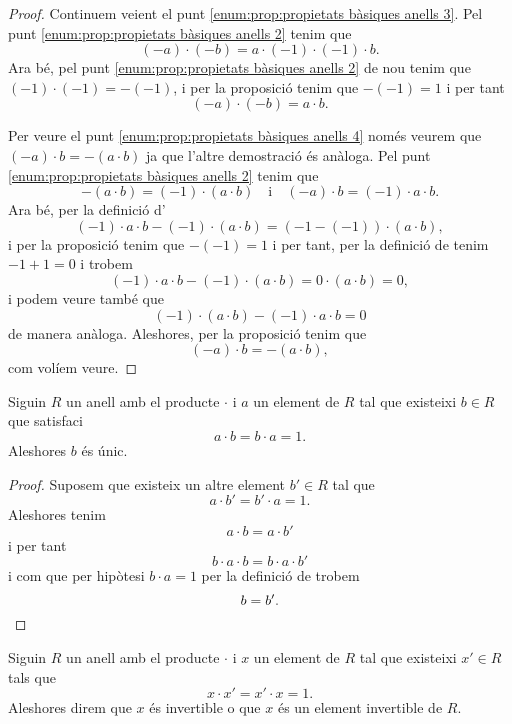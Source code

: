 \documentclass[../Apunts.tex]{subfiles}
\begin{document}
\begin{proposition}
\begin{proof}
			Continuem veient el punt \eqref{enum:prop:propietats bàsiques anells 3}. Pel punt \eqref{enum:prop:propietats bàsiques anells 2} tenim que
			\[(-a)\cdot(-b)=a\cdot (-1)\cdot(-1)\cdot b.\]
			Ara bé, pel punt \eqref{enum:prop:propietats bàsiques anells 2} de nou tenim que \((-1)\cdot(-1)=-(-1)\), i per la proposició  tenim que \(-(-1)=1\) i per tant
			\[(-a)\cdot(-b)=a\cdot b.\]
			
			Per veure el punt \eqref{enum:prop:propietats bàsiques anells 4} només veurem que \((-a)\cdot b=-(a\cdot b)\) ja que l'altre demostració és anàloga. Pel punt \eqref{enum:prop:propietats bàsiques anells 2} tenim que
			\[-(a\cdot b)=(-1)\cdot(a\cdot b)\quad{\text{i}}\quad(-a)\cdot b=(-1)\cdot a\cdot b.\]
			Ara bé, per la definició d'
			\[(-1)\cdot a\cdot b-(-1)\cdot(a\cdot b)=(-1-(-1))\cdot(a\cdot b),\]
			i per la proposició  tenim que \(-(-1)=1\) i per tant, per la definició de  tenim \(-1+1=0\) i trobem
			\[(-1)\cdot a\cdot b-(-1)\cdot(a\cdot b)=0\cdot(a\cdot b)=0,\]
			i podem veure també que
			\[(-1)\cdot(a\cdot b)-(-1)\cdot a\cdot b=0\]
			de manera anàloga. Aleshores, per la proposició  tenim que
			\[(-a)\cdot b=-(a\cdot b),\]
			com volíem veure.
		\end{proof}
	\end{proposition}
	\begin{proposition}
		\label{prop:unicitat invers en anells}
		Siguin \(R\) un anell amb el producte \(\cdot\) i \(a\) un element de \(R\) tal que existeixi \(b\in R\) que satisfaci
		\[a\cdot b=b\cdot a=1.\]
		Aleshores \(b\) és únic.
		\begin{proof}
			Suposem que existeix un altre element \(b'\in R\) tal que
			\[a\cdot b'=b'\cdot a=1.\]
			Aleshores tenim
			\[a\cdot b=a\cdot b'\]
			i per tant
			\[b\cdot a\cdot b=b\cdot a\cdot b'\]
			i com que per hipòtesi \(b\cdot a=1\) per la definició de  trobem
			\[b=b'.\qedhere\]
		\end{proof}
	\end{proposition}
	\begin{definition}
		\label{def:element invertible pel producte d'un anell}
		Siguin \(R\) un anell amb el producte \(\cdot\) i \(x\) un element de \(R\) tal que existeixi \(x'\in R\) tals que
		\[x\cdot x'=x'\cdot x=1.\] 
		Aleshores direm que \(x\) és invertible o que \(x\) és un element invertible de \(R\).
	\end{definition}
\end{document}

